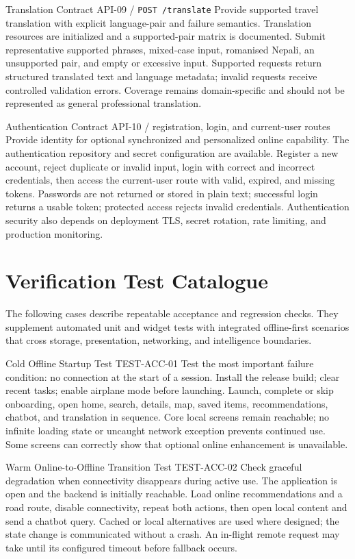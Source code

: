 \EvidenceSheet
{Translation Contract}
{API-09 / \texttt{POST /translate}}
{Provide supported travel translation with explicit language-pair and failure semantics.}
{Translation resources are initialized and a supported-pair matrix is documented.}
{Submit representative supported phrases, mixed-case input, romanised Nepali, an unsupported pair, and empty or excessive input.}
{Supported requests return structured translated text and language metadata; invalid requests receive controlled validation errors.}
{Coverage remains domain-specific and should not be represented as general professional translation.}

\EvidenceSheet
{Authentication Contract}
{API-10 / registration, login, and current-user routes}
{Provide identity for optional synchronized and personalized online capability.}
{The authentication repository and secret configuration are available.}
{Register a new account, reject duplicate or invalid input, login with correct and incorrect credentials, then access the current-user route with valid, expired, and missing tokens.}
{Passwords are not returned or stored in plain text; successful login returns a usable token; protected access rejects invalid credentials.}
{Authentication security also depends on deployment TLS, secret rotation, rate limiting, and production monitoring.}

\chapter{Verification Test Catalogue}
\label{app:test_catalogue}

The following cases describe repeatable acceptance and regression checks. They
supplement automated unit and widget tests with integrated offline-first
scenarios that cross storage, presentation, networking, and intelligence
boundaries.

\EvidenceSheet
{Cold Offline Startup Test}
{TEST-ACC-01}
{Test the most important failure condition: no connection at the start of a session.}
{Install the release build; clear recent tasks; enable airplane mode before launching.}
{Launch, complete or skip onboarding, open home, search, details, map, saved items, recommendations, chatbot, and translation in sequence.}
{Core local screens remain reachable; no infinite loading state or uncaught network exception prevents continued use.}
{Some screens can correctly show that optional online enhancement is unavailable.}

\EvidenceSheet
{Warm Online-to-Offline Transition Test}
{TEST-ACC-02}
{Check graceful degradation when connectivity disappears during active use.}
{The application is open and the backend is initially reachable.}
{Load online recommendations and a road route, disable connectivity, repeat both actions, then open local content and send a chatbot query.}
{Cached or local alternatives are used where designed; the state change is communicated without a crash.}
{An in-flight remote request may take until its configured timeout before fallback occurs.}

